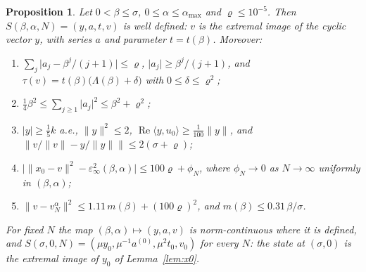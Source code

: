 \documentclass[11pt]{article}
\newtheorem{proposition}[theorem]{Proposition}
\theoremstyle{definition}
\newcommand{\ip}[2]{\langle #1,#2\rangle}
\newcommand{\norm}[1]{\lVert #1\rVert}
\newcommand{\abs}[1]{\lvert #1\rvert}
\newcommand{\re}{\operatorname{Re}}
\newcommand{\rhoN}{\varrho}
\begin{document}
\begin{proposition}\label{prop:states}
Let $0<\beta\le\sigma$, $0\le\alpha\le\alpha_{\max}$ and $\rhoN\le10^{-5}$. Then
$S(\beta,\alpha,N)=(y,a,t,v)$ is well defined: $v$ is the extremal image of the cyclic vector
$y$, with series $a$ and parameter $t=t(\beta)$. Moreover:
\begin{enumerate}[label=\textup{(\roman*)}]
\item $\sum_j\abs{a_j-\beta^j/(j+1)}\le\rhoN$, $\abs{a_j}\ge\beta^j/(j+1)$, and
$\tau(v)=t(\beta)\bigl(\Lambda(\beta)+\delta\bigr)$ with $0\le\delta\le\rhoN^2$;
\item $\frac14\beta^2\le\sum_{j\ge1}\abs{a_j}^2\le\beta^2+\rhoN^2$;
\item $\abs y\ge\frac15k$ a.e., $\norm y^2\le2$, $\re\ip y{u_0}\ge\frac1{100}\norm y$, and
$\bigl\|v/\norm v-y/\norm y\bigr\|\le2(\sigma+\rhoN)$;
\item $\bigl|\norm{x_0-v}^2-\varepsilon_\infty^2(\beta,\alpha)\bigr|\le100\rhoN+\phi_N$,
where $\phi_N\to0$ as $N\to\infty$ uniformly in $(\beta,\alpha)$;
\item $\norm{v-v_N^\alpha}^2\le1.11\,m(\beta)+(100\rhoN)^2$, and
$m(\beta)\le0.31\,\beta/\sigma$.
\end{enumerate}
For fixed $N$ the map $(\beta,\alpha)\mapsto(y,a,v)$ is norm-continuous where it is defined,
and $S(\sigma,0,N)=(\mu y_0,\mu^{-1}a^{(0)},\mu^2t_0,v_0)$ for every $N$: the state at
$(\sigma,0)$ is the extremal image of $y_0$ of Lemma~\ref{lem:x0}.
\end{proposition}
\end{document}
